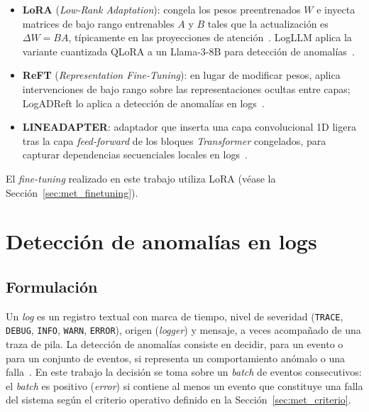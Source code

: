 \begin{itemize}
  \item \textbf{LoRA} (\textit{Low-Rank Adaptation}): congela los pesos preentrenados $W$ e inyecta matrices de bajo rango entrenables $A$ y $B$ tales que la actualización es $\Delta W = BA$, típicamente en las proyecciones de atención~\cite{lim2025_logadreft, wang2025_slm_survey, han2024_peft_survey}. LogLLM aplica la variante cuantizada QLoRA a un Llama-3-8B para detección de anomalías~\cite{guan2024_logllm}. %
  \item \textbf{ReFT} (\textit{Representation Fine-Tuning}): en lugar de modificar pesos, aplica intervenciones de bajo rango sobre las representaciones ocultas entre capas; LogADReft lo aplica a detección de anomalías en logs~\cite{lim2025_logadreft}.
  \item \textbf{LINEADAPTER}: adaptador que inserta una capa convolucional 1D ligera tras la capa \textit{feed-forward} de los bloques \textit{Transformer} congelados, para capturar dependencias secuenciales locales en logs~\cite{liu2025_lineadapter}.
\end{itemize}

El \textit{fine-tuning} realizado en este trabajo utiliza LoRA (véase la Sección~\ref{sec:met_finetuning}).

\section{Detección de anomalías en logs}\label{sec:mt_anomalias}

\subsection{Formulación}

Un \textit{log} es un registro textual con marca de tiempo, nivel de severidad (\texttt{TRACE}, \texttt{DEBUG}, \texttt{INFO}, \texttt{WARN}, \texttt{ERROR}), origen (\textit{logger}) y mensaje, a veces acompañado de una traza de pila. La detección de anomalías consiste en decidir, para un evento o para un conjunto de eventos, si representa un comportamiento anómalo o una falla~\cite{he2021_survey}. En este trabajo la decisión se toma sobre un \textit{batch} de eventos consecutivos: el \textit{batch} es positivo (\emph{error}) si contiene al menos un evento que constituye una falla del sistema según el criterio operativo definido en la Sección~\ref{sec:met_criterio}.

